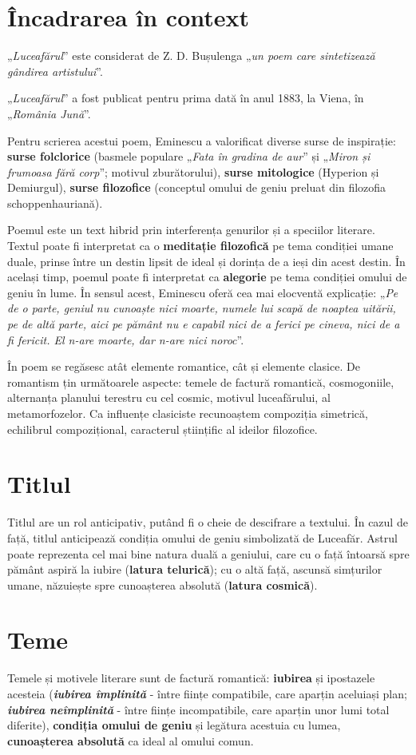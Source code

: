 \documentclass{article}
\newcommand{\qu}[1]{„\emph{#1}”}
\begin{document}
\section{Încadrarea în context}
\qu{Luceafărul} este considerat de Z. D. Bușulenga \qu{un poem care sintetizează gândirea artistului}.

\qu{Luceafărul} a fost publicat pentru prima dată în anul 1883, la Viena, în \qu{România Jună}.

Pentru scrierea acestui poem, Eminescu a valorificat diverse surse de inspirație: \textbf{surse folclorice} (basmele populare \qu{Fata în gradina de aur} și \qu{Miron și frumoasa fără corp}; motivul zburătorului), \textbf{surse mitologice} (Hyperion și Demiurgul), \textbf{surse filozofice} (conceptul omului de geniu preluat din filozofia schoppenhauriană).

Poemul este un text hibrid prin interferența genurilor și a speciilor literare. Textul poate fi interpretat ca o \textbf{meditație filozofică} pe tema condiției umane duale, prinse între un destin lipsit de ideal și dorința de a ieși din acest destin. În același timp, poemul poate fi interpretat ca \textbf{alegorie} pe tema condiției omului de geniu în lume. În sensul acest, Eminescu oferă cea mai elocventă explicație: \qu{Pe de o parte, geniul nu cunoaște nici moarte, numele lui scapă de noaptea uitării, pe de altă parte, aici pe pământ nu e capabil nici de a ferici pe cineva, nici de a fi fericit. El n-are moarte, dar n-are nici noroc}.

În poem se regăsesc atât elemente romantice, cât și elemente clasice. De romantism țin următoarele aspecte: temele de factură romantică, cosmogoniile, alternanța planului terestru cu cel cosmic, motivul luceafărului, al metamorfozelor. Ca influențe clasiciste recunoaștem compoziția simetrică, echilibrul compozițional, caracterul științific al ideilor filozofice.
\section{Titlul}
Titlul are un rol anticipativ, putând fi o cheie de descifrare a textului. În cazul de față, titlul anticipează condiția omului de geniu simbolizată de Luceafăr. Astrul poate reprezenta cel mai bine natura duală a geniului, care cu o față întoarsă spre pământ aspiră la iubire (\textbf{latura telurică}); cu o altă față, ascunsă simțurilor umane, năzuiește spre cunoașterea absolută (\textbf{latura cosmică}).

\section{Teme}
Temele și motivele literare sunt de factură romantică: \textbf{iubirea} și ipostazele acesteia (\textsl{\textbf{iubirea împlinită}} - între ființe compatibile, care aparțin aceluiași plan; \textsl{\textbf{iubirea neîmplinită}} - între ființe incompatibile, care aparțin unor lumi total diferite), \textbf{condiția omului de geniu} și legătura acestuia cu lumea, \textbf{cunoașterea absolută} ca ideal al omului comun.
\end{document}
